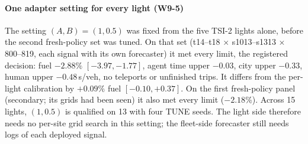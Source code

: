 \begin{table}[t]\centering\footnotesize\setlength{\tabcolsep}{2.5pt}
\caption{Wave 9, W9-1--4: the frozen TSI of W7-1 under perturbations (W7-1 panel, $5\times4\times20$). Agent fuel (\%) with 95\% interval;
agent time loss one-sided 95\% upper bound (s/veh); ``limits'' = every M3 limit against R under the same conditions.}\label{tab:w9}
\end{table}
\paragraph{One adapter setting for every light (W9-5)} The setting $(A,B)=(1,0.5)$ was fixed from the five TSI-2 lights alone, before the
second fresh-policy set was tuned. On that set (t14--t18 $\times$ s1013--s1313 $\times$ 800--819, each signal with its own forecaster) it met
every limit, the registered decision: fuel $-2.88\%$ $[-3.97,-1.77]$, agent time upper $-0.03$, city upper $-0.33$, human upper $-0.48$\,s/veh,
no teleports or unfinished trips. It differs from the per-light calibration by $+0.09\%$ fuel $[-0.10,+0.37]$. On the first fresh-policy
panel (secondary; its grids had been seen) it also met every limit ($-2.18\%$). Across 15 lights, $(1,0.5)$ is qualified on 13 with four
TUNE seeds. The light side therefore needs no per-site grid search in this setting; the fleet-side forecaster still needs logs of each
deployed signal.
